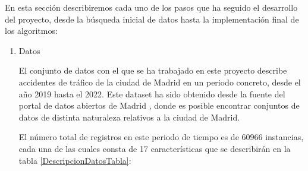     En esta sección describiremos cada uno de los pasos que ha seguido el desarrollo del proyecto, desde la búsqueda inicial de datos hasta la implementación final de los algoritmos:

    \begin{enumerate}

        \item Datos

            El conjunto de datos con el que se ha trabajado en este proyecto describe accidentes de tráfico de la ciudad de Madrid en un periodo concreto, desde el año 2019 hasta el 2022. Este dataset ha sido obtenido desde la fuente del portal de datos abiertos de Madrid \cite{Dataset}, donde es posible encontrar conjuntos de datos de distinta naturaleza relativos a la ciudad de Madrid.

            El número total de registros en este periodo de tiempo es de 60966 instancias, cada una de las cuales consta de 17 características que se describirán en la tabla \ref{DescripcionDatosTabla}:


\end{enumerate}
